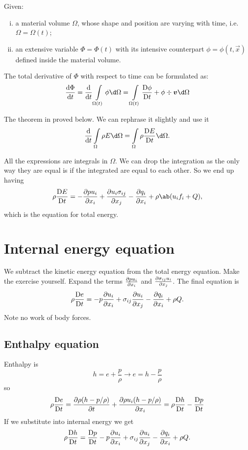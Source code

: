 \documentclass[justified, nobib,a4paper]{tufte-handout}
\begin{document}
\begin{theorem}
	Given:
	\begin{enumerate}[(i)]
		\item a material volume \(\Omega\), whose shape and position are varying with time,
		      i.e.\ \(\Omega = \Omega(t)\);
		\item an extensive variable \(\Phi = \Phi(t)\) with its intensive counterpart
		      \(\phi = \phi(t, \vec{x})\)  defined inside the material volume.
	\end{enumerate}
	The total derivative of \(\Phi\) with respect to time can be formulated as:
	\begin{equation}
    \odv{\Phi}{t} = \odv{}{t} \int\limits_{\Omega(t)} \phi \d \Omega
		= \int\limits_{\Omega(t)} \mdv{\phi}{t} + \phi \div{\vec{v}} \d \Omega
	\end{equation}
\end{theorem}

The theorem in proved below. We can rephrase it slightly and use it 
\[
  \odv{}{t}\int\limits_\Omega \rho E \d \Omega 
  = \int\limits_\Omega \rho \mdv{E}{t} \d \Omega.
\]

All the expressions are integrals in \(\Omega\). We can drop the integration as the only way they 
are equal is if the integrated  are equal to each other. So we end up having
\[
  \rho\mdv{E}{t} = -\pdv{pu_i}{x_i} + \pdv{u_i\sigma_{ij}}{x_j} - \pdv{q_i}{x_i} + \rho\ab(u_i f_i + Q),
\]
which is the equation for total energy.

\section{Internal energy equation}
We subtract the kinetic energy equation from the total energy equation. Make
the exercise yourself. Expand the terms \(\pdv{p u_i}{x_i}\) and
\(\pdv{\sigma_{ij}u_i}{x_j}\). The final equation is
\[
  \rho\mdv{e}{t} = -p\pdv{u_i}{x_i} + \sigma_{ij}\pdv{u_i}{x_j} - \pdv{q_i}{x_i} + \rho Q.
\]
Note no work of body forces.

\subsection{Enthalpy equation}
Enthalpy is 
\[
  h = e + \frac{p}{\rho} \rightarrow e = h - \frac{p}{\rho}
\]
so 
\[
  \rho\mdv{e}{t} = \pdv{\rho (h - p/\rho)}{t} + \pdv{\rho u_i (h - p/\rho)}{x_i} =
  \rho\mdv{h}{t} - \mdv{p}{t}
\]
If we substitute into internal energy we get
\[
  \rho\mdv{h}{t} = \mdv{p}{t} -p\pdv{u_i}{x_i} + \sigma_{ij}\pdv{u_i}{x_j} - \pdv{q_i}{x_i} + \rho Q.
\]
\end{document}
